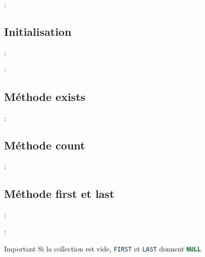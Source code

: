 \documentclass[10pt]{beamer}
\begin{document}
\begin{frame}{\secname : \subsecname}
    
\end{frame}

\subsection{Initialisation}
\begin{frame}{\secname : \subsecname}
    
\end{frame}

\begin{frame}{\secname : \subsecname}
    
\end{frame}

\subsection{Méthode exists}
\begin{frame}{\secname : \subsecname}
    
\end{frame}

\subsection{Méthode count}
\begin{frame}{\secname : \subsecname}
    
\end{frame}

\subsection{Méthode first et last}
\begin{frame}{\secname : \subsecname}
    
\end{frame}

\begin{frame}{\secname : \subsecname}
    \begin{alertblock}{Important}
        Si la collection est vide, \lstinline[language=sql]!FIRST! et \lstinline[language=sql]!LAST! donnent \lstinline[language=sql]!NULL!
    \end{alertblock}
\end{frame}
\end{document}
